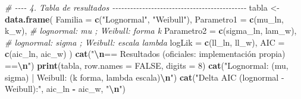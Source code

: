 \documentclass[
  spanish,
]{article}
\newenvironment{Shaded}{\begin{snugshade}}{\end{snugshade}}
\newcommand{\AttributeTok}[1]{\textcolor[rgb]{0.13,0.29,0.53}{#1}}
\newcommand{\CommentTok}[1]{\textcolor[rgb]{0.56,0.35,0.01}{\textit{#1}}}
\newcommand{\ConstantTok}[1]{\textcolor[rgb]{0.56,0.35,0.01}{#1}}
\newcommand{\DecValTok}[1]{\textcolor[rgb]{0.00,0.00,0.81}{#1}}
\newcommand{\FunctionTok}[1]{\textcolor[rgb]{0.13,0.29,0.53}{\textbf{#1}}}
\newcommand{\NormalTok}[1]{#1}
\newcommand{\OtherTok}[1]{\textcolor[rgb]{0.56,0.35,0.01}{#1}}
\newcommand{\SpecialCharTok}[1]{\textcolor[rgb]{0.81,0.36,0.00}{\textbf{#1}}}
\newcommand{\StringTok}[1]{\textcolor[rgb]{0.31,0.60,0.02}{#1}}
\begin{document}
\begin{Shaded}
\begin{Highlighting}[]
\CommentTok{\# {-}{-}{-}{-} 4. Tabla de resultados {-}{-}{-}{-}{-}{-}{-}{-}{-}{-}{-}{-}{-}{-}{-}{-}{-}{-}{-}{-}{-}{-}{-}{-}{-}{-}{-}{-}{-}{-}{-}{-}{-}{-}{-}{-}{-}{-}{-}{-}{-}{-}{-}{-}{-}}
\NormalTok{tabla }\OtherTok{\textless{}{-}} \FunctionTok{data.frame}\NormalTok{(}
  \AttributeTok{Familia   =} \FunctionTok{c}\NormalTok{(}\StringTok{"Lognormal"}\NormalTok{, }\StringTok{"Weibull"}\NormalTok{),}
  \AttributeTok{Parametro1 =} \FunctionTok{c}\NormalTok{(mu\_ln, k\_w),        }\CommentTok{\# lognormal: mu ; Weibull: forma k}
  \AttributeTok{Parametro2 =} \FunctionTok{c}\NormalTok{(sigma\_ln, lam\_w),   }\CommentTok{\# lognormal: sigma ; Weibull: escala lambda}
  \AttributeTok{logLik    =} \FunctionTok{c}\NormalTok{(ll\_ln, ll\_w),}
  \AttributeTok{AIC       =} \FunctionTok{c}\NormalTok{(aic\_ln, aic\_w)}
\NormalTok{)}
\FunctionTok{cat}\NormalTok{(}\StringTok{"}\SpecialCharTok{\textbackslash{}n}\StringTok{== Resultados (oficiales: implementación propia) ==}\SpecialCharTok{\textbackslash{}n}\StringTok{"}\NormalTok{)}
\FunctionTok{print}\NormalTok{(tabla, }\AttributeTok{row.names =} \ConstantTok{FALSE}\NormalTok{, }\AttributeTok{digits =} \DecValTok{8}\NormalTok{)}
\FunctionTok{cat}\NormalTok{(}\StringTok{"Lognormal: (mu, sigma) | Weibull: (k forma, lambda escala)}\SpecialCharTok{\textbackslash{}n}\StringTok{"}\NormalTok{)}
\FunctionTok{cat}\NormalTok{(}\StringTok{"Delta AIC (lognormal {-} Weibull):"}\NormalTok{, aic\_ln }\SpecialCharTok{{-}}\NormalTok{ aic\_w, }\StringTok{"}\SpecialCharTok{\textbackslash{}n}\StringTok{"}\NormalTok{)}


\end{Highlighting}
\end{Shaded}
\end{document}
